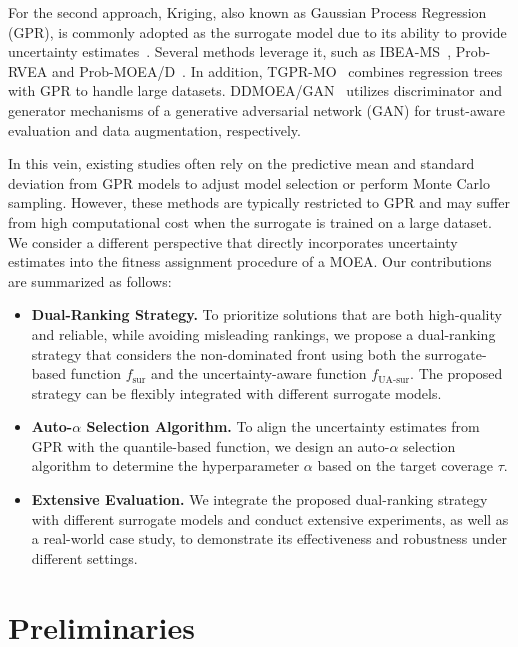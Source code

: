 \documentclass{article}
\begin{document}
For the second approach, Kriging, also known as Gaussian Process Regression (GPR), is commonly adopted as the surrogate model due to its ability to provide uncertainty estimates~\cite{gpr}. Several methods leverage it, such as IBEA-MS~\cite{ddeo_ibea}, Prob-RVEA and Prob-MOEA/D~\cite{ddeo_rvea}. In addition, TGPR-MO~\cite{ddeo-TGPR} combines regression trees with GPR to handle large datasets. DDMOEA/GAN~\cite{ddea_gan} utilizes discriminator and generator mechanisms of a generative adversarial network (GAN) for trust-aware evaluation and data augmentation, respectively.

In this vein, existing studies often rely on the predictive mean and standard deviation from GPR models to adjust model selection or perform Monte Carlo sampling. However, these methods are typically restricted to GPR and may suffer from high computational cost when the surrogate is trained on a large dataset. We consider a different perspective that directly incorporates uncertainty estimates into the fitness assignment procedure of a MOEA. Our contributions are summarized as follows:

\begin{itemize}
  \item \textbf{Dual-Ranking Strategy.}
  To prioritize solutions that are both high-quality and reliable, while avoiding misleading rankings, we propose a dual-ranking strategy that considers the non-dominated front using both the surrogate-based function $f_{\text{sur}}$ and the uncertainty-aware function $f_{\text{UA-sur}}$. The proposed strategy can be flexibly integrated with different surrogate models.
  
  \item \textbf{Auto-$\alpha$ Selection Algorithm.}
  To align the uncertainty estimates from GPR with the quantile-based function, we design an auto-$\alpha$ selection algorithm to determine the hyperparameter $\alpha$ based on the target coverage $\tau$.
  
  \item \textbf{Extensive Evaluation.}
  We integrate the proposed dual-ranking strategy with different surrogate models and conduct extensive experiments, as well as a real-world case study, to demonstrate its effectiveness and robustness under different settings.
\end{itemize}

\section{Preliminaries}
\end{document}

